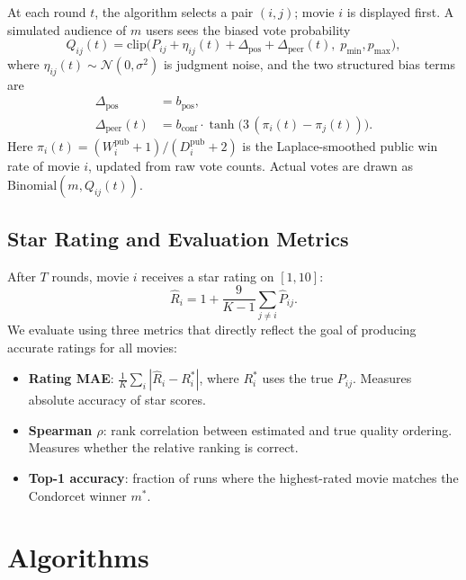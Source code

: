 \documentclass[12pt,a4paper]{article}
\begin{document}
At each round $t$, the algorithm selects a pair $(i, j)$; movie $i$ is displayed
first.  A simulated audience of $m$ users sees the biased vote probability
\begin{equation}\label{eq:obs}
  Q_{ij}(t) = \mathrm{clip}\!\bigl(
    P_{ij} + \eta_{ij}(t)
    + \Delta_{\text{pos}}
    + \Delta_{\text{peer}}(t),\;
    p_{\min}, p_{\max}
  \bigr),
\end{equation}
where $\eta_{ij}(t) \sim \mathcal{N}(0, \sigma^2)$ is judgment noise, and the
two structured bias terms are
\begin{align}
  \Delta_{\text{pos}} &= b_{\text{pos}},\label{eq:pos}\\
  \Delta_{\text{peer}}(t) &= b_{\text{conf}} \cdot \tanh\!\bigl(
    3\,(\pi_i(t) - \pi_j(t))\bigr).\label{eq:peer}
\end{align}
Here $\pi_i(t) = (W_i^{\text{pub}} + 1)/(D_i^{\text{pub}} + 2)$ is the
Laplace-smoothed public win rate of movie $i$, updated from raw vote counts.
Actual votes are drawn as $\mathrm{Binomial}(m, Q_{ij}(t))$.

\subsection{Star Rating and Evaluation Metrics}

After $T$ rounds, movie $i$ receives a star rating on $[1, 10]$:
\begin{equation}\label{eq:rating}
  \hat{R}_i = 1 + \frac{9}{K-1} \sum_{j \neq i} \hat{P}_{ij}.
\end{equation}
We evaluate using three metrics that directly reflect the goal of producing
accurate ratings for all movies:
\begin{itemize}
  \item \textbf{Rating MAE}: $\frac{1}{K}\sum_i |\hat{R}_i - R^*_i|$, where
    $R^*_i$ uses the true $P_{ij}$.  Measures absolute accuracy of star scores.
  \item \textbf{Spearman $\rho$}: rank correlation between estimated and true
    quality ordering.  Measures whether the relative ranking is correct.
  \item \textbf{Top-1 accuracy}: fraction of runs where the highest-rated movie
    matches the Condorcet winner $m^*$.
\end{itemize}

\section{Algorithms}
\end{document}
